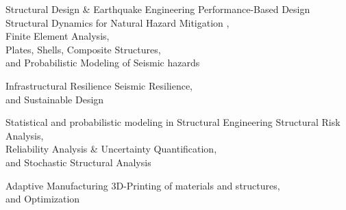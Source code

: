 

\begin{cvskills}
\vspace{7pt}
\cvskill
	{Structural Design \& Earthquake Engineering} %
	{Performance-Based Design $\hspace{2500pt}$  Structural Dynamics for Natural Hazard Mitigation , $\hspace{2500pt}$ Finite Element Analysis, $\hspace{2500pt}$ Plates, Shells, Composite Structures, $\hspace{2500pt}$ and Probabilistic Modeling of Seismic hazards} %


\vspace{7pt}
\cvskill
	{Infrastructural Resilience  } %
	{Seismic Resilience, $\hspace{2500pt}$ and Sustainable Design} %



\vspace{7pt}

\cvskill
	{Statistical and probabilistic modeling in Structural Engineering} %
	{Structural Risk Analysis, $\hspace{2500pt}$ Reliability Analysis \& Uncertainty Quantification, $\hspace{2500pt}$ and Stochastic Structural Analysis} %



\vspace{7pt}
\cvskill
	{Adaptive Manufacturing } %
	{3D-Printing of materials and structures, $\hspace{2500pt}$ and Optimization} %
	
\end{cvskills}
